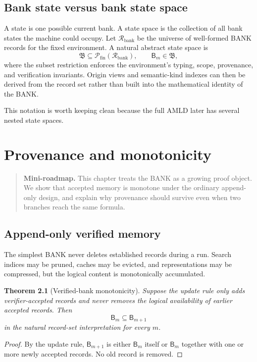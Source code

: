 \documentclass[11pt,openany]{book}
\newtheorem{theorem}{Theorem}[chapter]
\theoremstyle{definition}
\theoremstyle{remark}
\newenvironment{miniroadmap}{\begin{quote}\small\color{deepblue}\textbf{Mini-roadmap.} }{\end{quote}}
\newcommand{\Bank}{\mathsf{B}}
\newcommand{\BankSpace}{\mathfrak{B}}
\begin{document}
\section{Bank state versus bank state space}
A state is one possible current bank. A state space is the collection of all bank states the machine could occupy. Let $\mathcal R_{\mathrm{bank}}$ be the universe of well-formed BANK records for the fixed environment. A natural abstract state space is
\[
\BankSpace\subseteq\mathcal P_{\mathrm{fin}}(\mathcal R_{\mathrm{bank}}),
\qquad
\Bank_m\in\BankSpace,
\]
where the subset restriction enforces the environment's typing, scope, provenance, and verification invariants. Origin views and semantic-kind indexes can then be derived from the record set rather than built into the mathematical identity of the BANK.

This notation is worth keeping clean because the full AMLD later has several nested state spaces.

\chapter{Provenance and monotonicity}
\begin{miniroadmap}
This chapter treats the BANK as a growing proof object. We show that accepted memory is monotone under the ordinary append-only design, and explain why provenance should survive even when two branches reach the same formula.
\end{miniroadmap}

\section{Append-only verified memory}
The simplest BANK never deletes established records during a run. Search indices may be pruned, caches may be evicted, and representations may be compressed, but the logical content is monotonically accumulated.

\begin{theorem}[Verified-bank monotonicity]\label{thm:monotone}
Suppose the update rule only adds verifier-accepted records and never removes the logical availability of earlier accepted records. Then
\[
\Bank_m\subseteq\Bank_{m+1}
\]
in the natural record-set interpretation for every $m$.
\end{theorem}
\begin{proof}
By the update rule, $\Bank_{m+1}$ is either $\Bank_m$ itself or $\Bank_m$ together with one or more newly accepted records. No old record is removed.
\end{proof}
\end{document}
